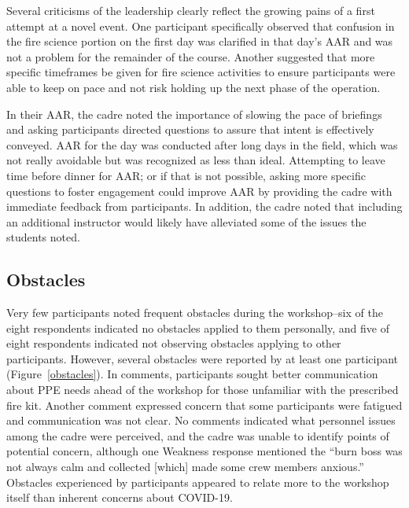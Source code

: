 \documentclass[fire,casereport,accept,moreauthors,pdftex]{Definitions/mdpi}  %
\begin{document}
Several criticisms of the leadership clearly reflect the growing pains of a first attempt at a novel event.
One participant specifically observed that confusion in the fire science portion on the first day was clarified in that day's AAR and was not a problem for the remainder of the course.
Another suggested that more specific timeframes be given for fire science activities to ensure participants were able to keep on pace and not risk holding up the next phase of the operation.

In their AAR, the cadre noted the importance of slowing the pace of briefings and asking participants directed questions to assure that intent is effectively conveyed.
AAR for the day was conducted after long days in the field, which was not really avoidable but was recognized as less than ideal.
Attempting to leave time before dinner for AAR; or if that is not possible, asking more specific questions to foster engagement could improve AAR by providing the cadre with immediate feedback from participants.
In addition, the cadre noted that including an additional instructor would likely have alleviated some of the issues the students noted.

\subsection{Obstacles}

Very few participants noted frequent obstacles during the workshop--six of the eight respondents indicated no obstacles applied to them personally, and five of eight respondents indicated not observing obstacles applying to other participants.
However, several obstacles were reported by at least one participant (Figure~\ref{obstacles}).
In comments, participants sought better communication about PPE needs ahead of the workshop for those unfamiliar with the prescribed fire kit.
Another comment expressed concern that some participants were fatigued and communication was not clear.
No comments indicated what personnel issues among the cadre were perceived, and the cadre was unable to identify points of potential concern, although one Weakness response mentioned the ``burn boss was not always calm and collected {[}which{]} made some crew members anxious.''
Obstacles experienced by participants appeared to relate more to the workshop itself than inherent concerns about COVID-19.
\end{document}
